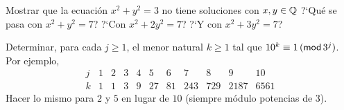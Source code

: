 \begin{ejerCongruencias}
	Mostrar que la ecuaci\'on $x^2+y^2=3$ no tiene soluciones
	con $x,y\in\Racionales$
	?`Qu\'e se pasa con $x^2+y^2=7$?
	?`Con $x^2+2y^2=7$? ?`Y con $x^2+3y^2=7$?
\end{ejerCongruencias}

\begin{ejerCongruencias}
	Determinar, para cada $j\geq 1$, el menor natural $k\geq 1$
	tal que $10^k\equiv 1\tmodulo[3^j]$. Por ejemplo,
	\begin{displaymath}
		\begin{array}{c|cccccccccc}
			j & 1 & 2 & 3 & 4 & 5 & 6 & 7 & 8 & 9 & 10 \\
			k & 1 & 1 & 3 & 9 & 27 & 81 & 243 & 729 & 2187 & 6561
		\end{array}
	\end{displaymath}
	Hacer lo mismo para $2$ y $5$ en lugar de $10$ (siempre
	m\'odulo potencias de $3$).
\end{ejerCongruencias}

